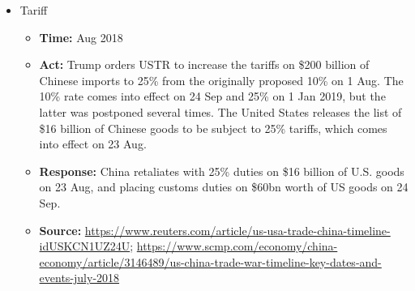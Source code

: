 \begin{itemize}
			\item Tariff
				\begin{itemize}
				\item \textbf{Time: } Aug 2018
				\item \textbf{Act: }Trump orders USTR to increase the tariffs on \$200 billion of Chinese imports to 25\% from the originally proposed 10\% on 1 Aug. The 10\% rate comes into effect on 24 Sep and 25\% on 1 Jan 2019, but the latter was postponed several times. The United States releases the list of \$16 billion of Chinese goods to be subject to 25\% tariffs, which comes into effect on 23 Aug. 
				\item \textbf{Response: }China retaliates with 25\% duties on \$16 billion of U.S. goods on 23 Aug, and placing customs duties on \$60bn worth of US goods on 24 Sep.
				\item	\textbf{Source: }\url{https://www.reuters.com/article/us-usa-trade-china-timeline-idUSKCN1UZ24U}; \url{https://www.scmp.com/economy/china-economy/article/3146489/us-china-trade-war-timeline-key-dates-and-events-july-2018}
				\end{itemize}
			
			

\end{itemize}

